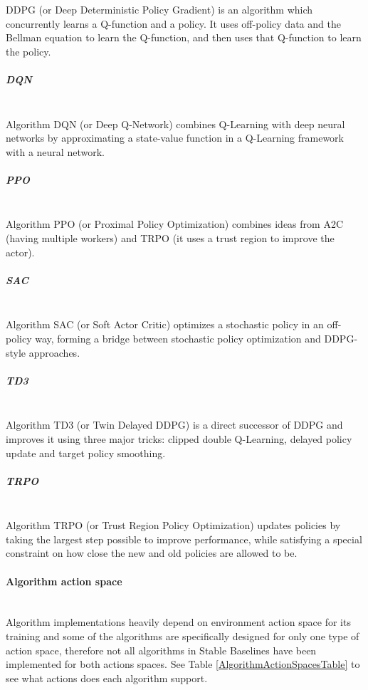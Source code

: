 \documentclass[12pt, a4paper]{article}
\begin{document}
DDPG (or Deep Deterministic Policy Gradient) \cite{lillicrap:2015} is an algorithm which concurrently learns a Q-function and a policy. It uses off-policy data and the Bellman equation to learn the Q-function, and then uses that Q-function to learn the policy.

\subparagraph{DQN}\mbox{}\\

Algorithm DQN (or Deep Q-Network) \cite{mnih:2013} combines Q-Learning with deep neural networks by approximating a state-value function in a Q-Learning framework with a neural network.

\subparagraph{PPO}\mbox{}\\

Algorithm PPO (or Proximal Policy Optimization) \cite{schulman:2017} combines ideas from A2C \cite{mnih:2016} (having multiple workers) and TRPO \cite{schulman:2015} (it uses a trust region to improve the actor).

\subparagraph{SAC}\mbox{}\\

Algorithm SAC (or Soft Actor Critic) \cite{haarnoja:2018} optimizes a stochastic policy in an off-policy way, forming a bridge between stochastic policy optimization and DDPG-style approaches.

\subparagraph{TD3}\mbox{}\\

Algorithm TD3 (or Twin Delayed DDPG) \cite{fujimoto:2018} is a direct successor of DDPG \cite{lillicrap:2015} and improves it using three major tricks: clipped double Q-Learning, delayed policy update and target policy smoothing. 

\subparagraph{TRPO}\mbox{}\\

Algorithm TRPO (or Trust Region Policy Optimization) \cite{schulman:2015} updates policies by taking the largest step possible to improve performance, while satisfying a special constraint on how close the new and old policies are allowed to be.

\paragraph{Algorithm action space}\mbox{}\\

Algorithm implementations heavily depend on environment action space for its training and some of the algorithms are specifically designed for only one type of action space, therefore not all algorithms in Stable Baselines have been implemented for both actions spaces. See Table \ref{AlgorithmActionSpacesTable} to see what actions does each algorithm support.
\end{document}
